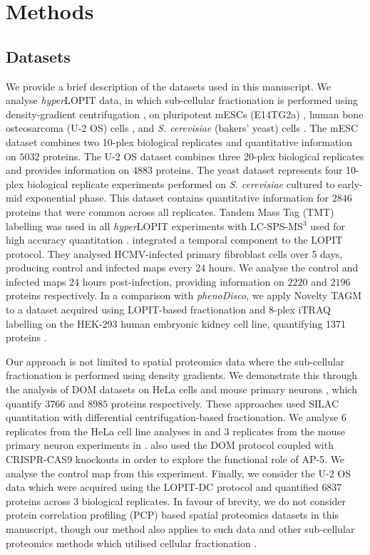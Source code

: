 \documentclass[12pt,english]{article}
\begin{document}
\section{Methods}
\subsection{Datasets}
We provide a brief description of the datasets used in this manuscript. We analyse \textit{hyper}LOPIT data, in which sub-cellular fractionation is performed using density-gradient centrifugation \citep{Dunkley:2004, Dunkley:2006, Mulvey:2017}, on pluripotent mESCs (E14TG2a) \citep{hyper}, human bone osteosarcoma (U-2 OS) cells \citep{Thul:2017, DC:2018}, and \textit{S. cerevisiae} (bakers' yeast) cells \citep{Nightingale::2019}. The mESC dataset combines two 10-plex biological replicates and quantitative information on $5032$ proteins. The U-2 OS dataset combines three 20-plex biological replicates and provides information on $4883$ proteins. The yeast dataset represents four 10-plex biological replicate experiments performed on \textit{S. cerevisiae} cultured to early-mid exponential phase. This dataset contains quantitative information for $2846$ proteins that were common across all replicates. Tandem Mass Tag (TMT) \citep{Thompson:2003} labelling was used in all \textit{hyper}LOPIT experiments with LC-SPS-MS$^{3}$ used for high accuracy quantitation \citep{Ting:2011, Mcalister::2014}. \cite{Jean_Beltran:2016} integrated a temporal component to the LOPIT protocol. They analysed HCMV-infected primary fibroblast cells over 5 days, producing control and infected maps every 24 hours. We analyse the control and infected maps 24 hours post-infection, providing information on $2220$ and $2196$ proteins respectively. In a comparison with \textit{phenoDisco}, we apply Novelty TAGM to a dataset acquired using LOPIT-based fractionation and 8-plex iTRAQ labelling on the HEK-293 human embryonic kidney cell line, quantifying 1371 proteins \citep{Breckels:2013}.

Our approach is not limited to spatial proteomics data where the sub-cellular fractionation is performed using density gradients. We demonstrate this through the analysis of DOM datasets on HeLa cells and mouse primary neurons \citep{Itzhak:2016, Itzhak::2017}, which quantify $3766$ and $8985$ proteins respectively. These approaches used SILAC quantitation with differential centrifugation-based fractionation. We analyse $6$ replicates from the HeLa cell line analyses in \cite{Itzhak:2016} and $3$ replicates from the mouse primary neuron experiments in \cite{Itzhak::2017}. \cite{Hirst:2018} also used the DOM protocol coupled with CRISPR-CAS9 knockouts in order to explore the functional role of AP-5. We analyse the control map from this experiment. Finally, we consider the U-2 OS data which were acquired using the LOPIT-DC protocol \citep{DC:2018} and quantified $6837$ proteins across $3$ biological replicates. In favour of brevity, we do not consider protein correlation profiling (PCP) based spatial proteomics datasets in this manuscript, though our method also applies to such data \citep{Foster:2006, kristensen:2012, kristensen:2014} and other sub-cellular proteomics methods which utilised cellular fractionation \citep{Orre:2019}.
\end{document}
